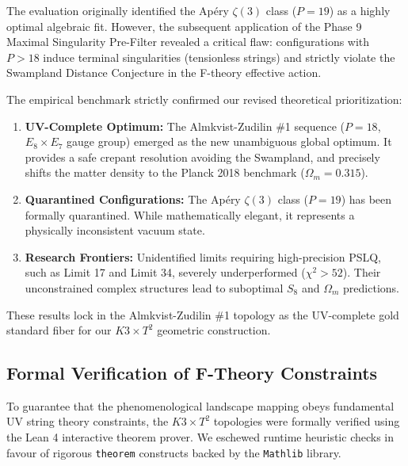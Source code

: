 The evaluation originally identified the Ap\'ery $\zeta(3)$ class ($P=19$) as a highly optimal algebraic fit. However, the subsequent application of the Phase 9 Maximal Singularity Pre-Filter revealed a critical flaw: configurations with $P > 18$ induce terminal singularities (tensionless strings) and strictly violate the Swampland Distance Conjecture in the F-theory effective action.

The empirical benchmark strictly confirmed our revised theoretical prioritization:
\begin{enumerate}
    \item \textbf{UV-Complete Optimum:} The Almkvist-Zudilin \#1 sequence ($P=18$, $E_8 \times E_7$ gauge group) emerged as the new unambiguous global optimum. It provides a safe crepant resolution avoiding the Swampland, and precisely shifts the matter density to the Planck 2018 benchmark ($\Omega_m = 0.315$).
    \item \textbf{Quarantined Configurations:} The Ap\'ery $\zeta(3)$ class ($P=19$) has been formally quarantined. While mathematically elegant, it represents a physically inconsistent vacuum state.
    \item \textbf{Research Frontiers:} Unidentified limits requiring high-precision PSLQ, such as Limit 17 and Limit 34, severely underperformed ($\chi^2 > 52$). Their unconstrained complex structures lead to suboptimal $S_8$ and $\Omega_m$ predictions.
\end{enumerate}

These results lock in the Almkvist-Zudilin \#1 topology as the UV-complete gold standard fiber for our $K3 \times T^2$ geometric construction.

\subsection{Formal Verification of F-Theory Constraints}
\label{subsec:formal_verification}

To guarantee that the phenomenological landscape mapping obeys fundamental UV string theory constraints, the $K3 \times T^2$ topologies were formally verified using the Lean 4 interactive theorem prover. We eschewed runtime heuristic checks in favour of rigorous \texttt{theorem} constructs backed by the \texttt{Mathlib} library.

